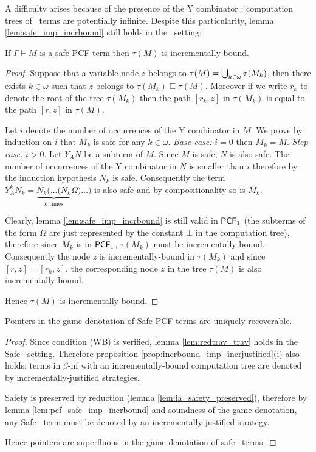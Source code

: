A difficulty arises because of the presence of the Y combinator :
computation trees of \pcf\ terms are potentially infinite. Despite
this particularity, lemma \ref{lem:safe_imp_incrbound} still holds
in the \pcf\ setting:
\begin{lem}
\label{lem:pcf_safe_imp_incrbound} If $\Gamma \vdash M$ is a safe
PCF term then $\tau(M)$ is incrementally-bound.
\end{lem}
\begin{proof}
Suppose that a variable node $z$ belongs to $\tau(M) =
\bigcup_{k\in\omega} \tau(M_k)$, then there exists $k\in \omega$ such
that $z$ belongs to $\tau(M_k) \sqsubseteq \tau(M)$. Moreover if we
write $r_k$ to denote the root of the tree $\tau(M_k)$ then the path
$[r_k,z]$ in $\tau(M_k)$ is equal to the path $[r,z]$ in $\tau(M)$.

Let $i$ denote the number of occurrences of the Y combinator in $M$.
We prove by induction on $i$ that $M_k$ is safe for any $k\in
\omega$. \emph{Base case:} $i=0$ then $M_k = M$. \emph{Step case:}
$i>0$. Let $Y_A N$ be a subterm of $M$. Since $M$ is safe, $N$ is
also safe. The number of occurrences of the Y combinator in $N$ is
smaller than $i$ therefore by the induction hypothesis $N_k$ is
safe. Consequently the term $Y_A^k N_k = \underbrace{N_k ( \ldots (
N_k}_{k \mbox{ times}} \Omega ) \ldots )$ is also safe and by
compositionality so is $M_k$.

Clearly, lemma \ref{lem:safe_imp_incrbound} is still valid in
$\textsf{PCF}_1$ (the subterms of the form $\Omega$ are just represented by
the constant $\bot$ in the computation tree), therefore since $M_k$
is in $\textsf{PCF}_1$, $\tau(M_k)$ must be incrementally-bound.
Consequently the node $z$ is incrementally-bound in $\tau(M_k)$ and
since $[r,z]=[r_k,z]$, the corresponding node $z$ in the tree
$\tau(M)$ is also incrementally-bound.

Hence $\tau(M)$ is incrementally-bound.
\end{proof}

\begin{thm}
Pointers in the game denotation of Safe PCF terms are uniquely
recoverable.
\end{thm}
\begin{proof}
Since condition (WB) is verified, lemma \ref{lem:redtrav_trav} holds
in the Safe \pcf\ setting. Therefore proposition
\ref{prop:incrbound_imp_incrjustified}(i) also holds: terms in
$\beta$-nf with an incrementally-bound computation tree are denoted
by incrementally-justified strategies.

Safety is preserved by reduction (lemma
\ref{lem:ia_safety_preserved}), therefore by lemma
\ref{lem:pcf_safe_imp_incrbound} and soundness of the game
denotation, any Safe \pcf\ term must be denoted by an
incrementally-justified strategy.

Hence pointers are superfluous in the game denotation of safe \pcf\
terms.
\end{proof}

